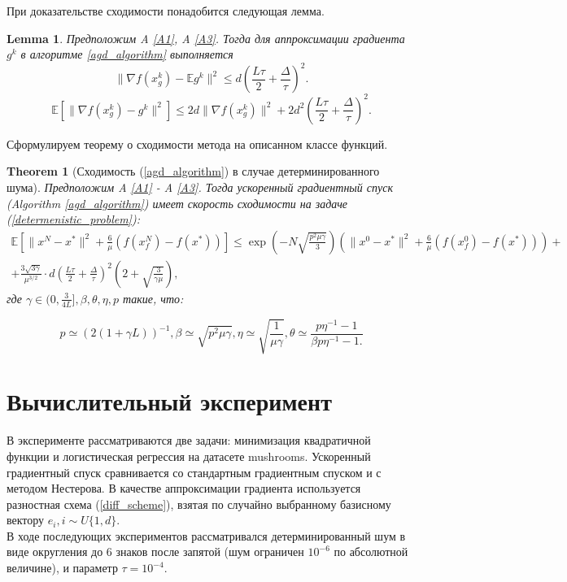 \documentclass{article}
\newtheorem{theorem}{Theorem}
\newtheorem{lemma}{Lemma}
\begin{document}
При доказательстве сходимости понадобится следующая лемма.
\begin{lemma}\label{lemma1}
 Предположим A \ref{A1}, A \ref{A3}. Тогда для аппроксимации градиента $g^k$ в алгоритме \ref{agd_algorithm} выполняется
 \begin{equation}
  \|\nabla f(x_g^k) - \mathbb{E}g^k\|^2 \leqslant d \left(\frac{L\tau}{2} + \frac{\Delta}{\tau}\right)^2.
  \label{norm_of_expectation}
 \end{equation}
 \begin{equation}
  \mathbb{E}[\|\nabla f(x_g^k) - g^k\|^2] \leqslant 2d \|\nabla f(x_g^k)\|^2 + 2 d^2 \left(\frac{L\tau}{2} + \frac{\Delta}{\tau}\right)^2.
  \label{expectation_of_norm}
 \end{equation}
\end{lemma}

Сформулируем теорему о сходимости метода на описанном классе функций.

\begin{theorem}[Сходимость (\ref{agd_algorithm}) в случае детерминированного шума]\label{theorem1}
  Предположим A \ref{A1} - A \ref{A3}. Тогда ускоренный градиентный спуск (Algorithm \ref{agd_algorithm}) имеет скорость сходимости на задаче (\ref{determenistic_problem}):
  \begin{equation}
   \begin{aligned}
   \mathbb{E}\left[\|x^N - x^*\|^2 + \frac{6}{\mu} (f(x_f^N) - f(x^*))\right] \leqslant \exp\left(- N\sqrt{\frac{p^2\mu\gamma}{3}}\right) \left(\|x^0 - x^*\|^2 + \frac{6}{\mu} (f(x_f^0) - f(x^*))\right) +\\ +\frac{3 \sqrt{3\gamma}}{\mu^{3/2}} \cdot d \left(\frac{L\tau}{2} + \frac{\Delta}{\tau}\right)^2\left(2 + \sqrt{\frac{3}{\gamma\mu}}\right),
   \label{deterministic_convergence}
   \end{aligned}
  \end{equation}
  где $\gamma \in (0, \frac{3}{4L}], \beta, \theta, \eta, p$ такие, что:

  \begin{equation}
   p \simeq (2(1 + \gamma L))^{-1}, \beta \simeq \sqrt{p^2 \mu \gamma}, \eta \simeq \sqrt{\frac{1}{\mu\gamma}}, \theta \simeq \frac{p \eta^{-1} - 1}{\beta p \eta^{-1} - 1.}
  \end{equation}

\end{theorem}

\section{Вычислительный эксперимент}
В эксперименте рассматриваются две задачи: минимизация квадратичной функции и логистическая регрессия на датасете mushrooms. Ускоренный градиентный спуск сравнивается со стандартным градиентным спуском и с методом Нестерова. В качестве аппроксимации градиента используется разностная схема (\ref{diff_scheme}), взятая по случайно выбранному базисному вектору $e_i, i \sim U\{1, d\}$.\\
В ходе последующих экспериментов рассматривался детерминированный шум в виде округления до 6 знаков после запятой (шум ограничен $10^{-6}$ по абсолютной величине), и параметр $\tau = 10^{-4}$.
\end{document}

